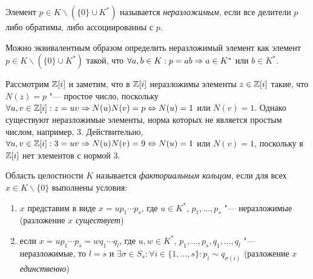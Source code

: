 \begin{definition}
	Элемент $p \in K \backslash (\{0\} \cup K^*)$ называется \textit{неразложимым}, если все делители $p$ либо обратимы, либо ассоциированны с $p$.
\end{definition}

\begin{note}
	Можно эквивалентным образом определить неразложимый элемент как элемент $p \in K \backslash (\{0\} \cup K^*)$ такой, что $\forall a, b \in K: p = ab \Rightarrow a \in K^*$ или $b \in K^*$.
\end{note}

\begin{example}
	Рассмотрим $\mathbb{Z}[i]$ и заметим, что в $\mathbb{Z}[i]$ неразложимы элементы $z \in \mathbb{Z}[i]$ такие, что $N(z) = p$ "--- простое число, поскольку $\forall u, v \in \mathbb{Z}[i]: z = uv \Rightarrow N(u)N(v) = p \Leftrightarrow N(u) = 1$ или $N(v) = 1$. Однако существуют неразложимые элементы, норма которых не является простым числом, например, 3. Действительно, $\forall u, v \in \Z[i]: 3 = uv \ra N(u)N(v) = 9 \hm\lra N(u) = 1$ или $N(v) = 1$, поскольку в $\mathbb{Z}[i]$ нет элементов с нормой 3.
\end{example}

\begin{definition}
	Область целостности $K$ называется \textit{факториальным кольцом}, если для всех $x \in K \backslash \{0\}$ выполнены условия:
	\begin{enumerate}
		\item $x$ представим в виде $x = up_1\dotsm p_s$, где $u \in K^*$, $p_1, \dotsc, p_s$ "--- неразложимые (разложение $x$ \textit{существует})
		\item если $x = up_1\dotsm p_s = wq_1 \dotsm q_l$, где $u, w \in K^*$, $p_1, \dotsc, p_s, q_1, \dotsc, q_l$ "--- неразложимые, то $l = s$ и $\exists \sigma \in S_s: \forall i \in \{1, \dotsc, s\}: p_i \sim q_{\sigma(i)}$ (разложение $x$ \textit{единственно})
	\end{enumerate}
\end{definition}

